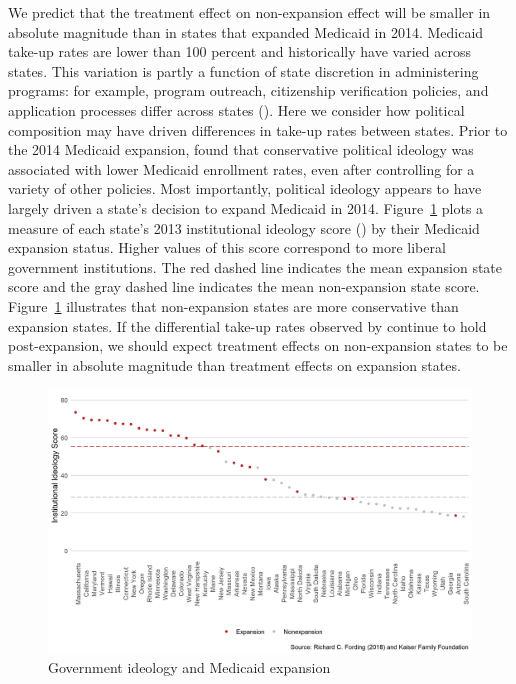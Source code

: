\documentclass[aoas]{imsart}
\theoremstyle{plain}
\theoremstyle{remark}
\begin{document}
We predict that the treatment effect on non-expansion effect will be smaller in absolute magnitude than in states that expanded Medicaid in 2014. Medicaid take-up rates are lower than 100 percent and historically have varied across states. This variation is partly a function of state discretion in administering programs: for example, program outreach, citizenship verification policies, and application processes differ across states (\cite{courtemanche2017early}). Here we consider how political composition may have driven differences in take-up rates between states. Prior to the 2014 Medicaid expansion, \cite{sommers2012understanding} found that conservative political ideology was associated with lower Medicaid enrollment rates, even after controlling for a variety of other policies. Most importantly, political ideology appears to have largely driven a state's decision to expand Medicaid in 2014. Figure~\ref{fig:stateideology} plots a measure of each state's 2013 institutional ideology score (\cite{berry1998measuring}) by their Medicaid expansion status. Higher values of this score correspond to more liberal government institutions. The red dashed line indicates the mean expansion state score and the gray dashed line indicates the mean non-expansion state score. Figure~\ref{fig:stateideology} illustrates that non-expansion states are more conservative than expansion states. If the differential take-up rates observed by \cite{sommers2012understanding} continue to hold post-expansion, we should expect treatment effects on non-expansion states to be smaller in absolute magnitude than treatment effects on expansion states. 

\begin{figure}[H]
    \begin{center}
    \caption{Government ideology and Medicaid expansion}
    \label{fig:stateideology}
    \includegraphics[scale=0.5]{01_Plots/political-expansion-plot.png}
    \end{center}
\end{figure}
\end{document}
